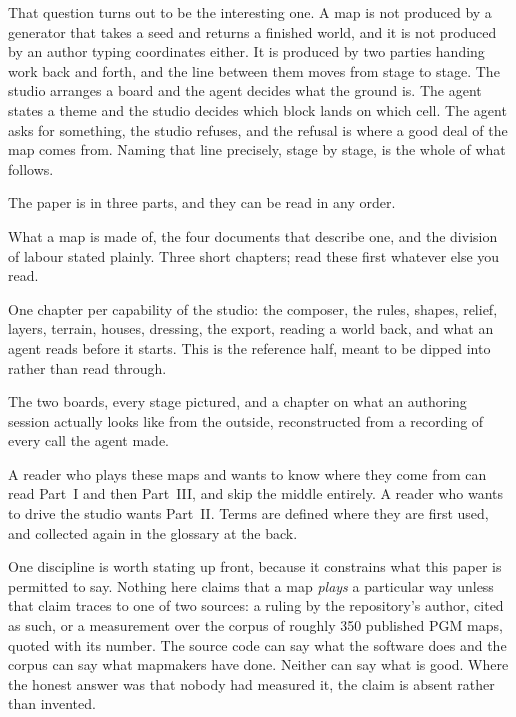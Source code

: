 \medskip\noindent
That question turns out to be the interesting one. A map is not produced by a
generator that takes a seed and returns a finished world, and it is not produced
by an author typing coordinates either. It is produced by two parties handing work
back and forth, and the line between them moves from stage to stage. The studio
arranges a board and the agent decides what the ground is. The agent states a
theme and the studio decides which block lands on which cell. The agent asks for
something, the studio refuses, and the refusal is where a good deal of the map
comes from. Naming that line precisely, stage by stage, is the whole of what
follows.

\medskip\noindent
The paper is in three parts, and they can be read in any order.

\begin{description}[leftmargin=1.6em,style=nextline,itemsep=5pt]
  \item[Part~I. The System] What a map is made of, the four documents that
    describe one, and the division of labour stated plainly. Three short
    chapters; read these first whatever else you read.
  \item[Part~II. The Instruments] One chapter per capability of the studio: the
    composer, the rules, shapes, relief, layers, terrain, houses, dressing, the
    export, reading a world back, and what an agent reads before it starts. This
    is the reference half, meant to be dipped into rather than read through.
  \item[Part~III. Two Maps, End to End] The two boards, every stage pictured, and
    a chapter on what an authoring session actually looks like from the outside,
    reconstructed from a recording of every call the agent made.
\end{description}

\medskip\noindent
A reader who plays these maps and wants to know where they come from can read
Part~I and then Part~III, and skip the middle entirely. A reader who wants to
drive the studio wants Part~II. Terms are defined where they are first used, and
collected again in the glossary at the back.

\medskip\noindent
One discipline is worth stating up front, because it constrains what this paper is
permitted to say. Nothing here claims that a map \emph{plays} a particular way
unless that claim traces to one of two sources: a ruling by the repository's
author, cited as such, or a measurement over the corpus of roughly 350 published
PGM maps, quoted with its number. The source code can say what the software does
and the corpus can say what mapmakers have done. Neither can say what is good.
Where the honest answer was that nobody had measured it, the claim is absent
rather than invented.

\clearpage
